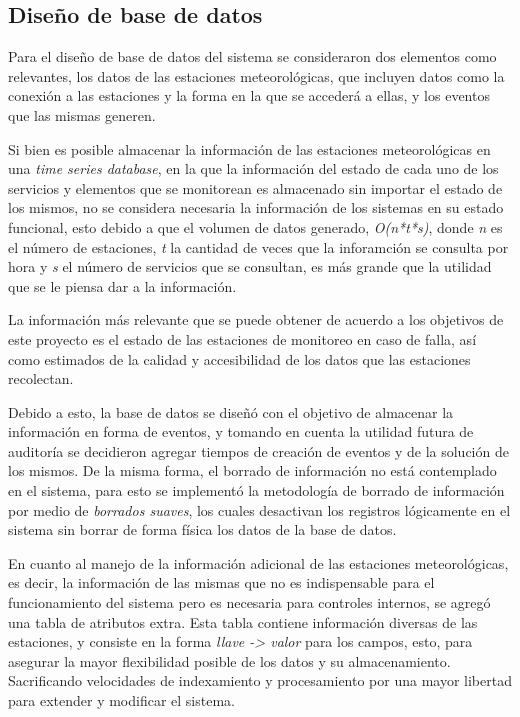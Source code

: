 \subsection{Diseño de base de datos}

Para el diseño de base de datos del sistema se consideraron dos elementos como relevantes, los datos de las estaciones meteorológicas, que incluyen datos como la conexión a las estaciones y la forma en la que se accederá a ellas, y los eventos que las mismas generen.

Si bien es posible almacenar la información de las estaciones meteorológicas en una \textit{time series database}, en la que la información del estado de cada uno de los servicios y elementos que se monitorean es almacenado sin importar el estado de los mismos, no se considera necesaria la información de los sistemas en su estado funcional, esto debido a que el volumen de datos generado, \textit{O(n*t*s)}, donde \textit{n} es el número de estaciones, \textit{t} la cantidad de veces que la inforamción se consulta por hora y \textit{s} el número de servicios que se consultan, es más grande que la utilidad que se le piensa dar a la información.

La información más relevante que se puede obtener de acuerdo a los objetivos de este proyecto es el estado de las estaciones de monitoreo en caso de falla, así como estimados de la calidad y accesibilidad de los datos que las estaciones recolectan.

Debido a esto, la base de datos se diseñó con el objetivo de almacenar la información en forma de eventos, y tomando en cuenta la utilidad futura de auditoría se decidieron agregar tiempos de creación de eventos y de la solución de los mismos. De la misma forma, el borrado de información no está contemplado en el sistema, para esto se implementó la metodología de borrado de información por medio de \textit{borrados suaves}, los cuales desactivan los registros lógicamente en el sistema sin borrar de forma física los datos de la base de datos.

En cuanto al manejo de la información adicional de las estaciones meteorológicas, es decir, la información de las mismas que no es indispensable para el funcionamiento del sistema pero es necesaria para controles internos, se agregó una tabla de atributos extra. Esta tabla contiene información diversas de las estaciones, y consiste en la forma \textit{llave -> valor} para los campos, esto, para asegurar la mayor flexibilidad posible de los datos y su almacenamiento. Sacrificando velocidades de indexamiento y procesamiento por una mayor libertad para extender y modificar el sistema.


